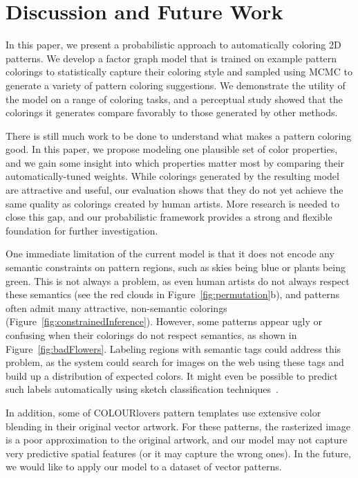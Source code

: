 \section{Discussion and Future Work}
\label{sec:discussion}

In this paper, we present a probabilistic approach to automatically coloring 2D patterns. We develop a factor graph model that is trained on example pattern colorings to statistically capture their coloring style and sampled using MCMC to generate a variety of pattern coloring suggestions. We demonstrate the utility of the model on a range of coloring tasks, and a perceptual study showed that the colorings it generates compare favorably to those generated by other methods.

There is still much work to be done to understand what makes a pattern coloring good. In this paper, we propose modeling one plausible set of color properties, and we gain some insight into which properties matter most by comparing their automatically-tuned weights. While colorings generated by the resulting model are attractive and useful, our evaluation shows that they do not yet achieve the same quality as colorings created by human artists. More research is needed to close this gap, and our probabilistic framework provides a strong and flexible foundation for further investigation.

One immediate limitation of the current model is that it does not encode any semantic constraints on pattern regions, such as skies being blue or plants being green. This is not always a problem, as even human artists do not always respect these semantics (see the red clouds in Figure~\ref{fig:permutation}b), and patterns often admit many attractive, non-semantic colorings (Figure~\ref{fig:constrainedInference}). However, some patterns appear ugly or confusing when their colorings do not respect semantics, as shown in Figure~\ref{fig:badFlowers}. Labeling regions with semantic tags could address this problem, as the system could search for images on the web using these tags and build up a distribution of expected colors. It might even be possible to predict such labels automatically using sketch classification techniques~\cite{SketchClassification}.

In addition, some of COLOURlovers pattern templates use extensive color blending in their original vector artwork. For these patterns, the rasterized image is a poor approximation to the original artwork, and our model may not capture very predictive spatial features (or it may capture the wrong ones). In the future, we would like to apply our model to a dataset of vector patterns.

